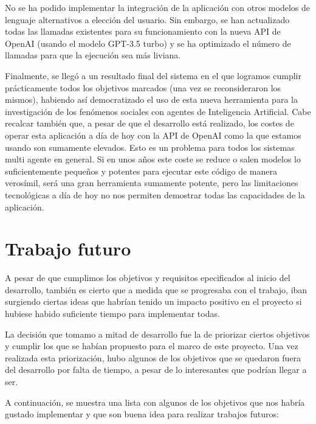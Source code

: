No se ha podido implementar la integración de la aplicación con otros modelos de lenguaje alternativos a elección del usuario. Sin embargo, se han actualizado todas las llamadas existentes para su funcionamiento con la nueva API de OpenAI (usando el modelo GPT-3.5 turbo) y se ha optimizado el número de llamadas para que la ejecución sea más liviana.

Finalmente, se llegó a un resultado final del sistema en el que logramos cumplir prácticamente todos los objetivos marcados (una vez se reconsideraron los mismos), habiendo así democratizado el uso de esta nueva herramienta para la investigación de los fenómenos sociales con agentes de Inteligencia Artificial. Cabe recalcar también que, a pesar de que el desarrollo está realizado, los costes de operar esta aplicación a día de hoy con la API de OpenAI como la que estamos usando son sumamente elevados. Esto es un problema para todos los sistemas multi agente en general. Si en unos años este coste se reduce o salen modelos lo suficientemente pequeños y potentes para ejecutar este código de manera verosímil, será una gran herramienta sumamente potente, pero las limitaciones tecnológicas a día de hoy no nos permiten demostrar todas las capacidades de la aplicación.

\section{Trabajo futuro}

A pesar de que cumplimos los objetivos y requisitos epecificados al inicio del desarrollo, también es cierto que a medida que se progresaba con el trabajo, iban surgiendo ciertas ideas que habrían tenido un impacto positivo en el proyecto si hubiese habido suficiente tiempo para implementar todas.

La decisión que tomamo a mitad de desarrollo fue la de priorizar ciertos objetivos y cumplir los que se habían propuesto para el marco de este proyecto. Una vez realizada esta priorización, hubo algunos de los objetivos que se quedaron fuera del desarrollo por falta de tiempo, a pesar de lo interesantes que podrían llegar a ser.

A continuación, se muestra una lista con algunos de los objetivos que nos habría gustado implementar y que son buena idea para realizar trabajos futuros:

